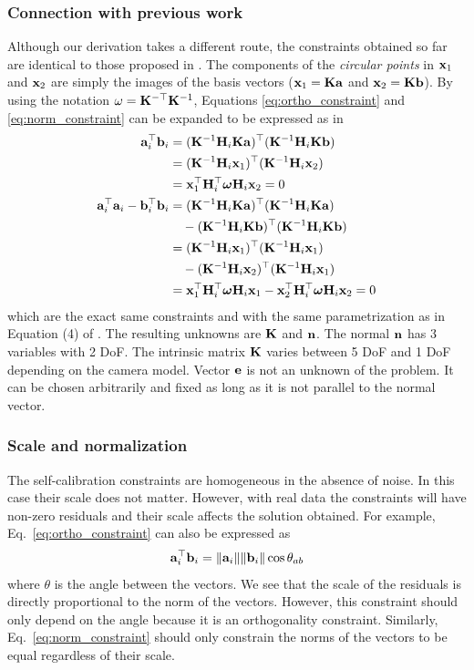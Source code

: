 \documentclass[10pt,twocolumn,letterpaper]{article}
\begin{document}
\subsubsection{Connection with previous work}
\label{sec:calib:connection}

Although our derivation takes a different route, the constraints obtained so far are identical to those proposed in \cite{bocquillon2006}. The components of the \emph{circular points} in \cite{bocquillon2006} $\mathbf{x}_1$ and $\mathbf{x}_2$ are simply the images of the basis vectors (\ie $\mathbf{x}_1=\mathbf{K} \mathbf{a}$ and $\mathbf{x}_2=\mathbf{K} \mathbf{b}$). By using the notation $\omega=\mathbf{K}^{-\top}\mathbf{K}^{-1}$, Equations \eqref{eq:ortho_constraint} and \eqref{eq:norm_constraint} can be expanded to be expressed as in \cite{bocquillon2006}
%
\begin{align}
\mathbf{a}_i^\top \mathbf{b}_i &= (\mathbf{K}^{-1} \mathbf{H}_i \mathbf{K} \mathbf{a})^\top (\mathbf{K}^{-1} \mathbf{H}_i \mathbf{K} \mathbf{b}) \notag \\
&= (\mathbf{K}^{-1} \mathbf{H}_i \mathbf{x}_1)^\top (\mathbf{K}^{-1} \mathbf{H}_i \mathbf{x}_2) \notag \\
&= \mathbf{x}_1^\top \mathbf{H}_i^\top \bm{\omega} \mathbf{H}_i \mathbf{x}_2 = 0 
\\
\mathbf{a}_i^\top \mathbf{a}_i - \mathbf{b}_i^\top \mathbf{b}_i &= (\mathbf{K}^{-1} \mathbf{H}_i \mathbf{K} \mathbf{a})^\top (\mathbf{K}^{-1} \mathbf{H}_i \mathbf{K} \mathbf{a}) \notag 
\\
&\quad - (\mathbf{K}^{-1} \mathbf{H}_i \mathbf{K} \mathbf{b})^\top (\mathbf{K}^{-1} \mathbf{H}_i \mathbf{K} \mathbf{b}) \notag 
\\
&= (\mathbf{K}^{-1} \mathbf{H}_i \mathbf{x}_1)^\top (\mathbf{K}^{-1} \mathbf{H}_i \mathbf{x}_1) \notag 
\\
&\quad - (\mathbf{K}^{-1} \mathbf{H}_i \mathbf{x}_2)^\top (\mathbf{K}^{-1} \mathbf{H}_i \mathbf{x}_1) \notag 
\\
&= \mathbf{x}_1^\top \mathbf{H}_i^\top \bm{\omega} \mathbf{H}_i \mathbf{x}_1 - \mathbf{x}_2^\top \mathbf{H}_i^\top \bm{\omega} \mathbf{H}_i \mathbf{x}_2 = 0 
\end{align}
which are the exact same constraints and with the same parametrization as in Equation (4) of \cite{bocquillon2006}. The resulting unknowns are $\mathbf{K}$ and $\mathbf{n}$. The normal $\mathbf{n}$ has 3 variables with 2 DoF. The intrinsic matrix $\mathbf{K}$ varies between 5 DoF and 1 DoF depending on the camera model. Vector $\mathbf{e}$ is not an unknown of the problem. It can be chosen arbitrarily and fixed as long as it is not parallel to the normal vector.

\subsubsection{Scale and normalization}
\label{sec:calib:normalization}

The self-calibration constraints are homogeneous in the absence of noise. In this case their scale does not matter. However, with real data the constraints will have non-zero residuals and their scale affects the solution obtained. For example, Eq.~\eqref{eq:ortho_constraint} can also be expressed as
\begin{align}
\mathbf{a}_i^\top \mathbf{b}_i = \lVert\mathbf{a}_i\rVert \lVert\mathbf{b}_i\rVert \cos \theta_{a b}
\end{align} 
where $\theta$ is the angle between the vectors. We see that the scale of the residuals is directly proportional to the norm of the vectors. However, this constraint should only depend on the angle because it is an orthogonality constraint. Similarly, Eq.~\eqref{eq:norm_constraint} should only constrain the norms of the vectors to be equal regardless of their scale.
\end{document}
